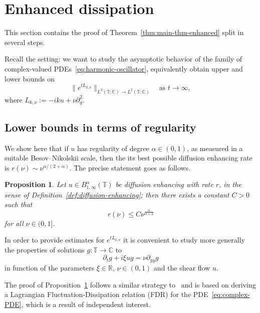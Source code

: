 \documentclass[11pt,oneside,reqno]{amsart}
\newcommand{\assign}{:=}
\newtheorem{proposition}[theorem]{Proposition}
{\theoremstyle{remark}\newtheorem{remark}[theorem]{Remark}}
\numberwithin{equation}{section}
\begin{document}
\section{Enhanced dissipation}\label{sec:enhanced-dissipation}

This section contains the proof of Theorem~\ref{thm:main-thm-enhanced} split
in several steps.

Recall the setting: we want to study the asymptotic behavior of the family of
complex-valued PDEs~\eqref{eq:harmonic-oscillator}, equivalently obtain upper
and lower bounds on
\[ \| e^{t L_{k, \nu}} \|_{L^2 (\mathbb{T}; \mathbb{C}) \rightarrow L^2
   (\mathbb{T}; \mathbb{C})} \quad \text{as } t \rightarrow \infty, \]
where $L_{k, \nu} \assign - i k u + \nu \partial_y^2 .$

\subsection{Lower bounds in terms of
regularity}\label{sec:lower-bound-enhanced}

We show here that if $u$ has regularity of degree $\alpha \in (0, 1)$, as
measured in a suitable Besov--Nikolskii scale, then the its best possible
diffusion enhancing rate is $r (\nu) \sim \nu^{\alpha / (2 + \alpha)}$. The
precise statement goes as follows.

\begin{proposition}
  \label{prop:lower-bound-enhanced}Let $u \in B^{\alpha}_{1, \infty}
  (\mathbb{T})$ be diffusion enhancing with rate $r$, in the sense of
  Definition~\ref{def:diffusion-enhancing}; then there exists a constant $C >
  0$ such that
  \[ r (\nu) \leqslant C \nu^{\frac{\alpha}{\alpha + 2}} \]
  for all $\nu \in (0, 1]$.
\end{proposition}

In order to provide estimates for $e^{t L_{k, \nu}}$ it is convenient to study
more generally the properties of solutions $g : \mathbb{T} \rightarrow
\mathbb{C}$ to
\begin{equation}
  \partial_t g + i \xi u g = \nu \partial_{y y} g \label{eq:complex-PDE}
\end{equation}
in function of the parameters $\xi \in \mathbb{R}$, $\nu \in (0, 1)$ and the
shear flow $u$.

The proof of Proposition~\ref{prop:lower-bound-enhanced} follows a similar
strategy to~{\cite{zelatidrivas}} and is based on deriving a Lagrangian
Fluctuation-Dissipation relation (FDR) for the PDE~\eqref{eq:complex-PDE},
which is a result of independent interest.
\end{document}
